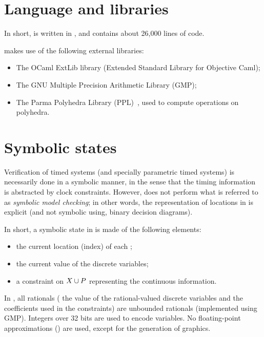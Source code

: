 \section{Language and libraries}

In short, \imitator{} is written in \ocaml{}, and contains about 26,000 lines of code.

\imitator{} makes use of the following external libraries:

\begin{itemize}
	\item The OCaml ExtLib library (Extended Standard Library for Objective Caml);
	\item The GNU Multiple Precision Arithmetic Library (GMP);
	\item The Parma Polyhedra Library (PPL)~\cite{BHZ08}, used to compute operations on polyhedra.
\end{itemize}


\section{Symbolic states}

Verification of timed systems (and specially parametric timed systems) is necessarily done in a symbolic manner, in the sense that the timing information is abstracted by clock constraints.
However, \imitator{} does not perform what is referred to as \emph{symbolic model checking}; in other words, the representation of locations in \imitator{} is explicit (and not symbolic using, \eg{} binary decision diagrams).


In short, a symbolic state in \imitator{} is made of the following elements:
\begin{itemize}
	\item the current location (index) of each \IPTA{};
	\item the current value of the discrete variables;
	\item a constraint on $X \cup P$ representing the continuous information.
\end{itemize}
In \imitator{}, all rationals (\ie{} the value of the rational-valued discrete variables and the coefficients used in the constraints) are unbounded rationals (implemented using GMP).
Integers over 32 bits are used to encode  variables.
No floating-point approximations () are used, except for the generation of graphics.


